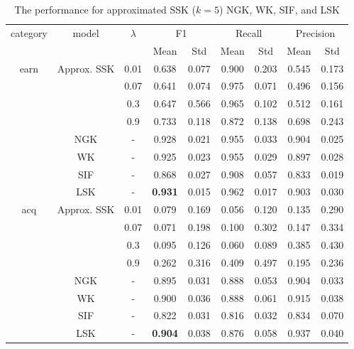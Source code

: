 \documentclass{article}
\begin{document}
\begin{table}[]
\centering
\caption{The performance for approximated SSK ($k=5$) NGK, WK, SIF, and LSK}
\label{k_5_performance}
\begin{tabular}{|c|c|c|c|c|c|c|c|c|}
\hline
\multirow{2}{*}{category} & \multirow{2}{*}{model} & \multirow{2}{*}{$\lambda$} & \multicolumn{2}{|c|}{F1} & \multicolumn{2}{|c|}{Recall} & \multicolumn{2}{|c|}{Precision} \\ \cline{4-9}
 & & & \multirow{1}{*}{Mean} & \multirow{1}{*}{Std} & \multirow{1}{*}{Mean} & \multirow{1}{*}{Std} & \multirow{1}{*}{Mean} & \multirow{1}{*}{Std}\\ \hline
\multirow{8}{*}{earn} &
\multirow{4}{*}{Approx. SSK}
   & 0.01 & 0.638 & 0.077 & 0.900 & 0.203 & 0.545  & 0.173 \\
 & & 0.07 & 0.641 & 0.074 & 0.975 & 0.071 & 0.496 & 0.156 \\
 & & 0.3 & 0.647 & 0.566 & 0.965 & 0.102 & 0.512 & 0.161 \\
 & & 0.9 & 0.733 & 0.118 & 0.872 & 0.138 & 0.698 & 0.243 \\ \cline{2-9}
 & \multirow{1}{*}{NGK} & - & 0.928 & 0.021 & 0.955 & 0.033 & 0.904 & 0.025  \\ \cline{2-9}
 & \multirow{1}{*}{WK}  & - & 0.925 & 0.023 & 0.955 & 0.029 & 0.897 & 0.028 \\ \cline{2-9}
 & \multirow{1}{*}{SIF} & - & 0.868 & 0.027 & 0.908 & 0.057 & 0.833 & 0.019 \\ \cline{2-9}
 & \multirow{1}{*}{LSK} & - & \textbf{0.931} & 0.015 & 0.962 & 0.017 & 0.903 & 0.030 \\ \hline
 \multirow{8}{*}{acq} &
 \multirow{4}{*}{Approx. SSK}
   & 0.01 & 0.079 & 0.169 & 0.056 & 0.120 & 0.135 & 0.290  \\
 & & 0.07 & 0.071 & 0.198 & 0.100 & 0.302 & 0.147 & 0.334  \\
 & & 0.3 & 0.095 & 0.126 & 0.060 & 0.089 & 0.385 & 0.430  \\
 & & 0.9 & 0.262 & 0.316 & 0.409 & 0.497 & 0.195 & 0.236  \\ \cline{2-9}
 & \multirow{1}{*}{NGK} & - & 0.895 & 0.031 & 0.888 & 0.053 & 0.904 & 0.033 \\ \cline{2-9}
 & \multirow{1}{*}{WK}  & - & 0.900 & 0.036 & 0.888 & 0.061 & 0.915 & 0.038 \\ \cline{2-9}
 & \multirow{1}{*}{SIF} & - & 0.822 & 0.031 & 0.816 & 0.032 & 0.834 & 0.070 \\ \cline{2-9}
 & \multirow{1}{*}{LSK} & - & \textbf{0.904} & 0.038 & 0.876 & 0.058 & 0.937 & 0.040 \\ \hline

\end{tabular}
\end{table}
\end{document}
